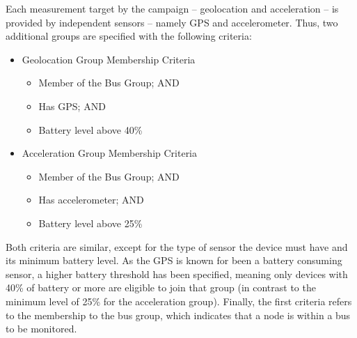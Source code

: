 Each measurement target by the campaign -- geolocation and acceleration -- is provided by independent sensors -- namely GPS and accelerometer. Thus, two additional groups are specified with the following criteria:

\begin{itemize}
	
	\item Geolocation Group Membership Criteria
	
	\begin{itemize}
		
		\item Member of the Bus Group; AND
		
		\item Has GPS; AND
		
		\item Battery level above 40\%
		
	\end{itemize}
	
	\item Acceleration Group Membership Criteria
	
	\begin{itemize}
		
		\item Member of the Bus Group; AND
		
		\item Has accelerometer; AND
		
		\item Battery level above 25\%
		
	\end{itemize}
	
\end{itemize}

Both criteria are similar, except for the type of sensor the device must have and its minimum battery level. As the GPS is known for been a battery consuming sensor, a higher battery threshold has been specified, meaning only devices with 40\% of battery or more are eligible to join that group (in contrast to the minimum level of 25\% for the acceleration group). Finally, the first criteria refers to the membership to the bus group, which indicates that a node is within a bus to be monitored.



